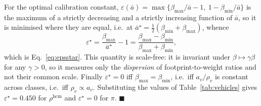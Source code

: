 \documentclass[journal]{IEEEtran}
\begin{document}
For the optimal calibration constant, $\varepsilon(\bar a) =
\max\{\beta_{\max}/\bar a - 1,\ 1 - \beta_{\min}/\bar a\}$ is the maximum
of a strictly decreasing and a strictly increasing function of $\bar a$,
so it is minimised where they are equal, i.e.\ at
$\bar a^\star = \tfrac12(\beta_{\min}+\beta_{\max})$, whence
\begin{equation}
\varepsilon^\star = \frac{\beta_{\max}}{\bar a^\star} - 1
 = \frac{\beta_{\max}-\beta_{\min}}{\beta_{\max}+\beta_{\min}},
\end{equation}
which is Eq.~\eqref{eq:epsstar}. This quantity is scale-free: it is
invariant under $\beta \mapsto \gamma\beta$ for any $\gamma>0$, so it
measures only the \emph{dispersion} of footprint-to-weight ratios and not
their common scale. Finally $\varepsilon^\star=0$ iff
$\beta_{\max}=\beta_{\min}$, i.e.\ iff $a_v/\rho_v$ is constant across
classes, i.e.\ iff $\rho_v \propto a_v$. Substituting the values of
Table~\ref{tab:vehicles} gives $\varepsilon^\star = 0.450$ for
$\rho^{\mathrm{hcm}}$ and $\varepsilon^\star = 0$ for $\pi$.
\hfill$\blacksquare$
\end{document}
